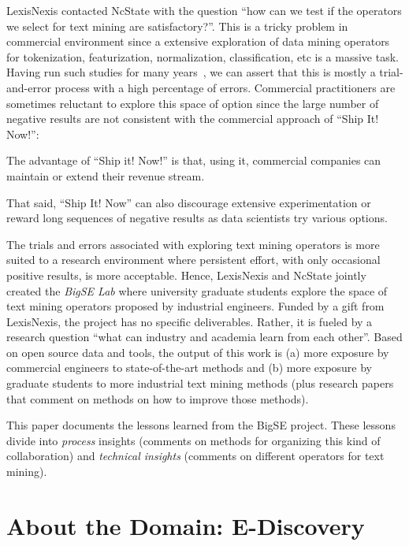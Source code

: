 \documentclass{sig-alternate-05-2015}
\newcommand{\bi}{\begin{itemize*}}
\newcommand{\ei}{\end{itemize*}}
\theoremstyle{break}
\begin{document}
LexisNexis contacted NcState with the question ``how can
we test if the operators we select for text mining are 
satisfactory?''. This is a tricky problem in commercial
environment since a
extensive exploration of  data mining operators for
tokenization, featurization, normalization, classification, etc
is a massive task. Having run such studies for many years~\cite{menzies2014sharing},
we can assert that this is mostly a trial-and-error process
with a high percentage of errors. Commercial practitioners
are sometimes reluctant to explore this  space of option
since the large number of negative results are not consistent
with the commercial approach of ``Ship It! Now!'':
\bi
\item
The advantage
of ``Ship it! Now!'' is that, using it,  commercial companies can maintain
or extend their revenue stream.
\item
That said, ``Ship It! Now''
can also discourage extensive experimentation or reward  long sequences
of negative results as data scientists try various options.
\ei
The trials and errors associated with exploring text mining operators
is more suited to a research environment where persistent effort, with only occasional positive results, is more acceptable. Hence,
LexisNexis and NcState jointly created the {\em BigSE Lab}  where
university graduate students explore    the space of text mining
operators proposed by 
industrial engineers.  Funded by a gift from LexisNexis, the project has no specific deliverables. Rather, it is fueled by a research question ``what can
  industry and academia learn from each other''. Based on open source
  data and tools, the output of this work is (a) more exposure by commercial engineers to state-of-the-art methods and (b) more
  exposure by graduate students
    to more industrial text mining methods (plus research
  papers that comment on methods on how to improve  those methods).





This paper documents the lessons learned from the BigSE project. 
These lessons divide into {\em process} insights (comments
on methods for organizing this kind of collaboration) and {\em technical
insights} (comments on different operators for text mining).
 
 
  
   


\section{About the Domain: E-Discovery}
\end{document}
